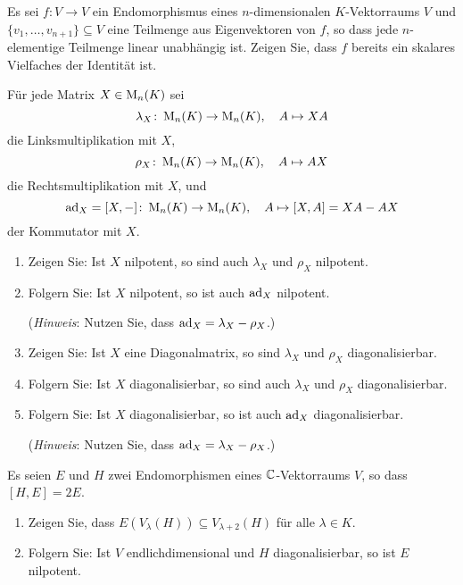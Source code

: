 \begin{question}[subtitle = Eine Knobelaufgabe]{3}
  Es sei $f \colon V \to V$ ein Endomorphismus eines $n$-dimensionalen $K$-Vektorraums $V$ und $\{ v_1, \dotsc, v_{n+1} \} \subseteq V$ eine Teilmenge aus Eigenvektoren von $f$, so dass jede $n$-elementige Teilmenge linear unabhängig ist.
  Zeigen Sie, dass $f$ bereits ein skalares Vielfaches der Identität ist.
\end{question}


\begin{question}[subtitle = Diagonalisierbarkeit und Nilpotenz von $\ad_X$]{3}
  Für jede Matrix $X \in \operatorname{M}_n(K)$ sei
  \[
    \lambda_X \colon \operatorname{M}_n(K) \to \operatorname{M}_n(K),
    \quad
    A \mapsto XA
  \]
  die Linksmultiplikation mit $X$,
  \[
    \rho_X \colon \operatorname{M}_n(K) \to \operatorname{M}_n(K),
    \quad
    A \mapsto AX
  \]
  die Rechtsmultiplikation mit $X$, und
  \[
    \operatorname{ad}_X = [X, -] \colon \operatorname{M}_n(K) \to \operatorname{M}_n(K),
    \quad
    A \mapsto [X, A] = XA - AX
  \]
  der Kommutator mit $X$.
  \begin{enumerate}[leftmargin=*]
    \item
      Zeigen Sie:
      Ist $X$ nilpotent, so sind auch $\lambda_X$ und $\rho_X$ nilpotent.
    \item
      Folgern Sie:
      Ist $X$ nilpotent, so ist auch $\ad_X$ nilpotent.
      
      (\emph{Hinweis}:
      Nutzen Sie, dass $\operatorname{ad}_X = \lambda_X - \rho_X$.)
    \item
      Zeigen Sie:
      Ist $X$ eine Diagonalmatrix, so sind $\lambda_X$ und $\rho_X$ diagonalisierbar.
    \item
      Folgern Sie:
      Ist $X$ diagonalisierbar, so sind auch $\lambda_X$ und $\rho_X$ diagonalisierbar.
    \item
      Folgern Sie:
      Ist $X$ diagonalisierbar, so ist auch $\ad_X$ diagonalisierbar.
      
      (\emph{Hinweis}:
       Nutzen Sie, dass $\operatorname{ad}_X = \lambda_X - \rho_X$.)
  \end{enumerate}
\end{question}


\begin{question}[subtitle = Shiften von Eigenräumen]{3}
  Es seien $E$ und $H$ zwei Endomorphismen eines $\mathbb{C}$-Vektorraums $V$, so dass $[H,E] = 2E$.
  \begin{enumerate}[leftmargin=*]
    \item
      Zeigen Sie, dass $E(V_\lambda(H)) \subseteq V_{\lambda + 2}(H)$ für alle $\lambda \in K$.
    \item
      Folgern Sie: Ist $V$ endlichdimensional und $H$ diagonalisierbar, so ist $E$ nilpotent.
  \end{enumerate}
\end{question}










